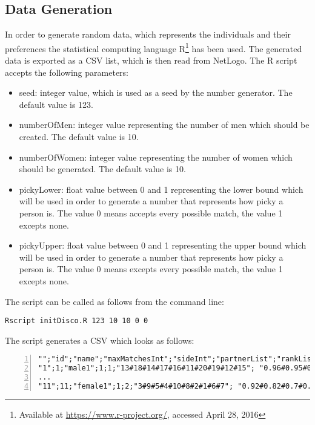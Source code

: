 \clearpage
\subsection{Data Generation}
In order to generate random data, which represents the individuals and their preferences the statistical computing language R\footnote{Available at \url{https://www.r-project.org/}, accessed April 28, 2016} has been used. 
The generated data is exported as a CSV list, which is then read from NetLogo. 
The R script accepts the following parameters:
\begin{itemize}
	\item seed: integer value, which is used as a seed by the number generator. The default value is 123.
	\item numberOfMen: integer value representing the number of men which should be created. The default value is 10.
	\item numberOfWomen: integer value representing the number of women which should be generated. The default value is 10.
	\item pickyLower: float value between 0 and 1 representing the lower bound which will be used in order to generate a number that represents how picky a person is. The value 0 means accepts every possible match, the value 1 excepts none.
	\item pickyUpper: float value between 0 and 1 representing the upper bound which will be used in order to generate a number that represents how picky a person is. The value 0 means excepts every possible match, the value 1 excepts none.
\end{itemize}

The script can be called as follows from the command line: 
\begin{verbatim}
Rscript initDisco.R 123 10 10 0 0
\end{verbatim}

The script generates a CSV which looks as follows:
\begin{lstlisting}[numbers=left, breaklines=true] 
"";"id";"name";"maxMatchesInt";"sideInt";"partnerList";"rankList"
"1";1;"male1";1;1;"13#18#14#17#16#11#20#19#12#15"; "0.96#0.95#0.9#0.68#0.57#0.45#0.33#0.25#0.1#0.04"
...
"11";11;"female1";1;2;"3#9#5#4#10#8#2#1#6#7"; "0.92#0.82#0.7#0.67#0.48#0.41#0.35#0.25#0.22#0.05"
\end{lstlisting}

\clearpage
